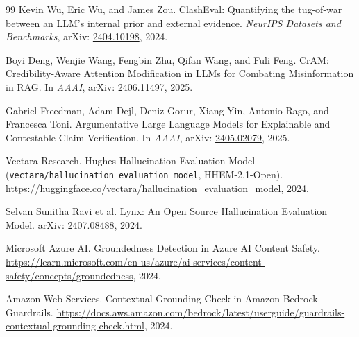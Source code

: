 \documentclass[11pt,a4paper]{article}
\begin{document}
\begin{thebibliography}{99}
Kevin Wu, Eric Wu, and James Zou.
\newblock ClashEval: Quantifying the tug-of-war between an LLM's internal prior and external evidence.
\newblock \emph{NeurIPS Datasets and Benchmarks}, arXiv: \href{https://arxiv.org/abs/2404.10198}{2404.10198}, 2024.

Boyi Deng, Wenjie Wang, Fengbin Zhu, Qifan Wang, and Fuli Feng.
\newblock CrAM: Credibility-Aware Attention Modification in LLMs for Combating Misinformation in RAG.
\newblock In \emph{AAAI}, arXiv: \href{https://arxiv.org/abs/2406.11497}{2406.11497}, 2025.

Gabriel Freedman, Adam Dejl, Deniz Gorur, Xiang Yin, Antonio Rago, and Francesca Toni.
\newblock Argumentative Large Language Models for Explainable and Contestable Claim Verification.
\newblock In \emph{AAAI}, arXiv: \href{https://arxiv.org/abs/2405.02079}{2405.02079}, 2025.

Vectara Research.
\newblock Hughes Hallucination Evaluation Model (\texttt{vectara/hallucination\_evaluation\_model}, HHEM-2.1-Open).
\newblock \url{https://huggingface.co/vectara/hallucination_evaluation_model}, 2024.

Selvan Sunitha Ravi et al.
\newblock Lynx: An Open Source Hallucination Evaluation Model.
\newblock arXiv: \href{https://arxiv.org/abs/2407.08488}{2407.08488}, 2024.

Microsoft Azure AI.
\newblock Groundedness Detection in Azure AI Content Safety.
\newblock \url{https://learn.microsoft.com/en-us/azure/ai-services/content-safety/concepts/groundedness}, 2024.

Amazon Web Services.
\newblock Contextual Grounding Check in Amazon Bedrock Guardrails.
\newblock \url{https://docs.aws.amazon.com/bedrock/latest/userguide/guardrails-contextual-grounding-check.html}, 2024.
\end{thebibliography}
\end{document}

